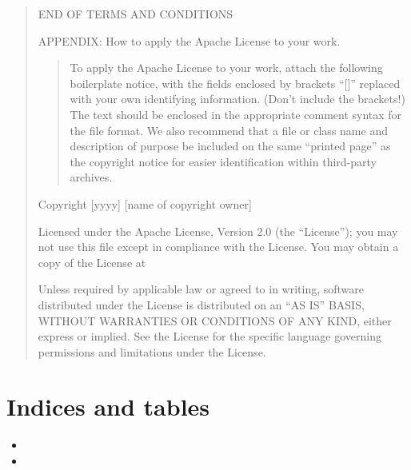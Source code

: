 \documentclass[letterpaper,10pt,english]{sphinxmanual}
\begin{document}
\begin{quote}
\begin{enumerate}
\end{enumerate}

END OF TERMS AND CONDITIONS

APPENDIX: How to apply the Apache License to your work.
\begin{quote}

To apply the Apache License to your work, attach the following
boilerplate notice, with the fields enclosed by brackets “{[}{]}”
replaced with your own identifying information. (Don’t include
the brackets!)  The text should be enclosed in the appropriate
comment syntax for the file format. We also recommend that a
file or class name and description of purpose be included on the
same “printed page” as the copyright notice for easier
identification within third-party archives.
\end{quote}

Copyright {[}yyyy{]} {[}name of copyright owner{]}

Licensed under the Apache License, Version 2.0 (the “License”);
you may not use this file except in compliance with the License.
You may obtain a copy of the License at
\begin{quote}

\end{quote}

Unless required by applicable law or agreed to in writing, software
distributed under the License is distributed on an “AS IS” BASIS,
WITHOUT WARRANTIES OR CONDITIONS OF ANY KIND, either express or implied.
See the License for the specific language governing permissions and
limitations under the License.
\end{quote}


\chapter{Indices and tables}
\label{\detokenize{index:indices-and-tables}}\begin{itemize}
\item {} 

\item {} 

\end{itemize}



\renewcommand{\indexname}{Index}
\printindex
\end{document}

